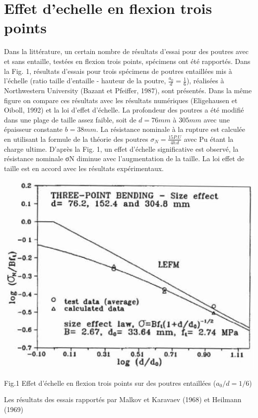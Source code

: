 \documentclass[12pt]{report}
\begin{document}
\section{Effet d'echelle en flexion trois points}
Dans la littérature, un certain nombre de résultats d'essai pour des poutres avec et sans entaille,
testées en flexion trois points, spécimens ont été rapportés. Dans la Fig. 1, résultats d'essais pour
trois spécimens de poutres entaillées mis à l'échelle (ratio taille d'entaille - hauteur de la poutre,
$\frac{a_0}{d} = \frac{1}{6}$), réalisées à Northwestern University (Bazant et Pfeiffer, 1987), sont présentés. Dans
la même figure on compare ces résultats avec les résultats numériques (Eligehausen et Oiboll,
1992) et la loi d'effet d'échelle. La profondeur des poutres a été modifié dans une plage de taille
assez faible, soit de $d = 76 mm$ à $305 mm$ avec une épaisseur constante $b = 38 mm$. La résistance
nominale à la rupture est calculée en utilisant la formule de la théorie des poutres $\sigma_N = \frac{15P.U}{4b.d}$
avec Pu étant la charge ultime. D'après la Fig. 1, un effet d'échelle significative est observé, la
résistance nominale σN diminue avec l'augmentation de la taille. La loi effet de taille est en
accord avec les résultats expérimentaux.
\begin{center}
\includegraphics[scale=0.65]{Fig_1}
\end{center}
\begin{center}
\caption{Fig.1 Effet d'échelle en flexion trois points sur des poutres entaillées ($a_0/d=1/6$)}
\end{center}
Les résultats des essais rapportés par Malkov et Karavaev (1968) et Heilmann (1969)
\end{document}

